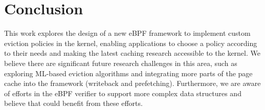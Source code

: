 \section{Conclusion}

This work explores the design of a new eBPF framework to implement custom eviction policies in the kernel, enabling applications to choose a policy according to their needs and making the latest caching research accessible to the kernel. We believe there are significant future research challenges in this area, such as exploring ML-based eviction algorithms and integrating more parts of the page cache into the \name framework (\eg writeback and prefetching). Furthermore, we are aware of efforts in the eBPF verifier to support more complex data structures and believe that \name could benefit from these efforts.
